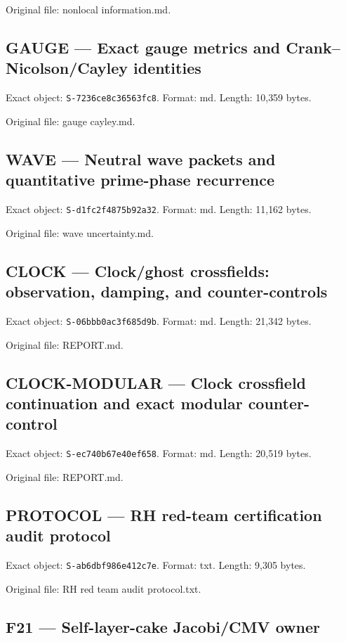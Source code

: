 \documentclass[
  10pt,
  a4paper,
  10pt,
  oneside,
  openany]{book}
\begin{document}
Original file: nonlocal information.md.

\subsection{GAUGE --- Exact gauge metrics and Crank--Nicolson/Cayley
identities}\label{source-gauge}

Exact object: \texttt{S-7236ce8c36563fc8}. Format: md. Length: 10,359
bytes.

Original file: gauge cayley.md.

\subsection{WAVE --- Neutral wave packets and quantitative prime-phase
recurrence}\label{source-wave}

Exact object: \texttt{S-d1fc2f4875b92a32}. Format: md. Length: 11,162
bytes.

Original file: wave uncertainty.md.

\subsection{CLOCK --- Clock/ghost crossfields: observation, damping, and
counter-controls}\label{source-clock}

Exact object: \texttt{S-06bbb0ac3f685d9b}. Format: md. Length: 21,342
bytes.

Original file: REPORT.md.

\subsection{CLOCK-MODULAR --- Clock crossfield continuation and exact
modular counter-control}\label{source-clock-modular}

Exact object: \texttt{S-ec740b67e40ef658}. Format: md. Length: 20,519
bytes.

Original file: REPORT.md.

\subsection{PROTOCOL --- RH red-team certification audit
protocol}\label{source-protocol}

Exact object: \texttt{S-ab6dbf986e412c7e}. Format: txt. Length: 9,305
bytes.

Original file: RH red team audit protocol.txt.

\subsection{F21 --- Self-layer-cake Jacobi/CMV owner}\label{source-f21}
\end{document}
